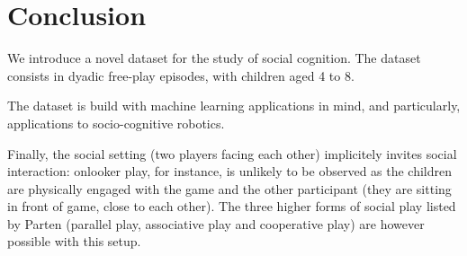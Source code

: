 \documentclass{article}
\begin{document}
%
%
%

\section{Conclusion}
%
%

We introduce a novel dataset for the study of social cognition. The dataset
consists in dyadic free-play episodes, with children aged 4 to 8.

The dataset is build with machine learning applications in mind, and
particularly, applications to socio-cognitive robotics.


Finally, the social setting (two players facing each other) implicitely invites
social interaction: onlooker play, for instance, is unlikely to be observed as
the children are physically engaged with the game and the other participant
(they are sitting in front of game, close to each other). The three higher forms
of social play listed by Parten (parallel play, associative play and cooperative
play) are however possible with this setup.




\end{document}
